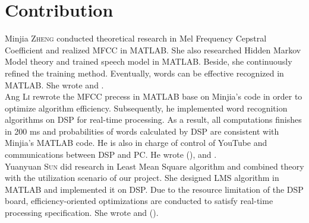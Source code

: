 \chapter*{Contribution}

Minjia \textsc{Zheng} conducted theoretical research in Mel Frequency Cepstral Coefficient and realized MFCC in MATLAB. She also researched Hidden Markov Model theory and trained speech model in MATLAB. Beside, she continuously refined the training method. Eventually, words can be effective recognized in MATLAB. She wrote  and .\\

Ang \textsc{Li} rewrote the MFCC precess in MATLAB base on Minjia's code in order to optimize algorithm efficiency. Subsequently, he implemented word recognition algorithms on DSP for real-time processing. As a result, all computations finishes in 200 ms and probabilities of words calculated by DSP are consistent with Minjia's MATLAB code. He is also in charge of control of YouTube and communications between DSP and PC. He wrote  (),  and .\\

Yuanyuan \textsc{Sun} did research in Least Mean Square algorithm and combined theory with the utilization scenario of our project. She designed LMS algorithm in MATLAB and implemented it on DSP. Due to the resource limitation of the DSP board, efficiency-oriented optimizations are conducted to satisfy real-time processing specification. She wrote  and  ().
